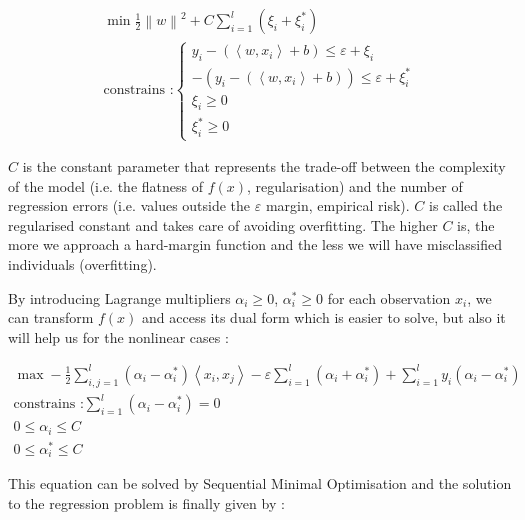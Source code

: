\documentclass[11pt,a4paper,oneside]{book}
\begin{document}
\begin{equation}
\begin{matrix}
\min \frac{1}{2} \left \| w \right \|^{2} + C\sum_{i=1}^{l}(\xi_{i}+\xi_{i}^*)\\
\text{constrains :}
\left\{\begin{matrix}
y_{i} - (\left \langle w, x_{i} \right \rangle + b)\leq \varepsilon + \xi_{i}\\ 
-(y_{i} - (\left \langle w, x_{i} \right \rangle + b))\leq \varepsilon + \xi_{i}^*\\ 
\xi_{i} \geq 0\\ 
\xi_{i}^*\geq 0
\end{matrix}\right. 
\end{matrix}
\end{equation}


$C$\label{cost} is the constant parameter that represents the trade-off between the complexity of the model (i.e. the flatness of $f\left ( x \right )$, regularisation) and the number of regression errors (i.e. values outside the $\varepsilon$ margin, empirical risk). $C$ is called the regularised constant and takes care of avoiding overfitting. The higher $C$ is, the more we approach a hard-margin function and the less we will have misclassified individuals (overfitting).


By introducing Lagrange multipliers $\alpha_i \geq 0$, $\alpha_i^*\geq 0$ for each observation $x_i$, we can transform  $f\left ( x \right )$ and access its dual form which is easier to solve, but also it will help us for the nonlinear cases \cite{Cortes}\cite{Smola} : 


\begin{equation}
\begin{matrix}
\max -\frac{1}{2} \sum_{i,j = 1}^l \left ( \alpha _i - \alpha _i^* \right )\left \langle x_i, x_j \right \rangle - \varepsilon\sum_{i=1}^l\left ( \alpha _i + \alpha _i^* \right ) + \sum_{i=1}^l y_i\left ( \alpha _i - \alpha _i^* \right )\\
\text{constrains :}
\sum_{i=1}^l \left ( \alpha _i - \alpha _i^* \right) = 0 \\
0 \leq \alpha _i \leq C \\
0 \leq \alpha _i^* \leq C
\end{matrix}
\end{equation}


This equation can be solved by Sequential Minimal Optimisation and the solution to the regression problem is finally given by \cite{Cortes}\cite{Smola}:
\end{document}
